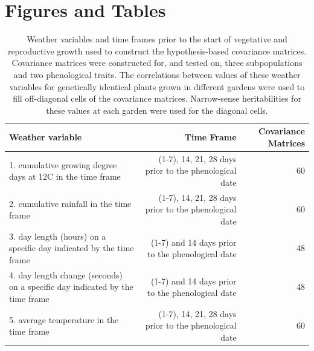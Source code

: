 \documentclass[
  9pt,
  twocolumn,
  twoside]{pnas-new}
\begin{document}
\section{Figures and Tables}\label{figures-and-tables}

\clearpage
\onecolumn
\begin{table}[t!]
\centering
\caption{Weather variables and time frames prior to the start of vegetative and reproductive growth used to construct the hypothesis-based covariance matrices. Covariance matrices were constructed for, and tested on, three subpopulations and two phenological traits. The correlations between values of these weather variables for genetically identical plants grown in different gardens were used to fill off-diagonal cells of the covariance matrices. Narrow-sense heritabilities for these values at each garden were used for the diagonal cells.}
\begin{tabular}{lrr}
Weather variable & Time Frame & Covariance Matrices \\
\midrule
1. cumulative growing degree days at 12C in the time frame & (1-7), 14, 21, 28 days prior to the phenological date & 60 \\
2. cumulative rainfall in the time frame & (1-7), 14, 21, 28 days prior to the phenological date & 60  \\
3. day length (hours) on a specific day indicated by the time frame & (1-7) and 14 days prior to the phenological date & 48 \\
4. day length change (seconds) on a specific day indicated by the time frame & (1-7) and 14 days prior to the phenological date & 48 \\
5. average temperature in the time frame & (1-7), 14, 21, 28 days prior to the phenological date & 60 \\
\bottomrule
\end{tabular}

\end{table}
\clearpage
\twocolumn
\end{document}
